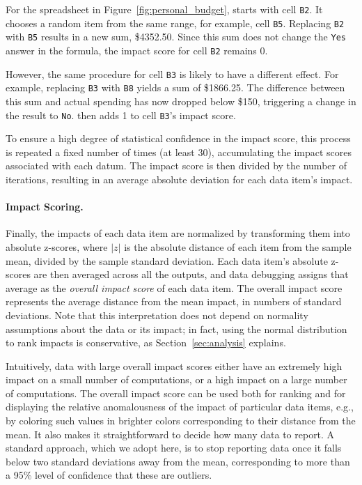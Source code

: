 For the spreadsheet in Figure~\ref{fig:personal_budget}, \checkcell{}
starts with cell \texttt{B2}. It chooses a random item from the same
range, for example, cell \texttt{B5}. Replacing \texttt{B2}
with \texttt{B5} results in a new sum, \$4352.50. Since this sum does
not change the \texttt{Yes} answer in the formula, the impact score
for cell \texttt{B2} remains 0.

However, the same procedure for cell \texttt{B3} is likely to have a
different effect.  For example, replacing \texttt{B3}
with \texttt{B8} yields a sum of \$1866.25. The difference
between this sum and actual spending has now dropped below \$150,
triggering a change in the result to \texttt{No}. \checkcell{} then
adds 1 to cell \texttt{B3}'s impact score.


To ensure a high degree of statistical confidence in the impact score,
this process is repeated a fixed number of times (at least 30),
accumulating the impact scores associated with each datum. The impact
score is then divided by the number of iterations, resulting in an
average absolute deviation for each data item's impact.

\paragraph{Impact Scoring.}
Finally, the impacts of each data item are normalized by transforming
them into absolute z-scores, where $|z|$ is the absolute distance of
each item from the sample mean, divided by the sample standard
deviation. Each data item's absolute z-scores are then averaged across
all the outputs, and data debugging assigns that average as the
\emph{overall impact score} of each data item. The overall impact
score represents the average distance from the mean impact, in numbers
of standard deviations. Note that this interpretation does not depend
on normality assumptions about the data or its impact; in fact, using
the normal distribution to rank impacts is conservative, as
Section~\ref{sec:analysis} explains.

Intuitively, data with large overall impact scores either have an
extremely high impact on a small number of computations, or a high
impact on a large number of computations. The overall impact score can
be used both for ranking and for displaying the relative anomalousness
of the impact of particular data items, e.g., by coloring such values
in brighter colors corresponding to their distance from the mean. It
also makes it straightforward to decide how many data to report. A
standard approach, which we adopt here, is to stop reporting data once
it falls below two standard deviations away from the mean,
corresponding to more than a 95\% level of confidence that these are
outliers.


